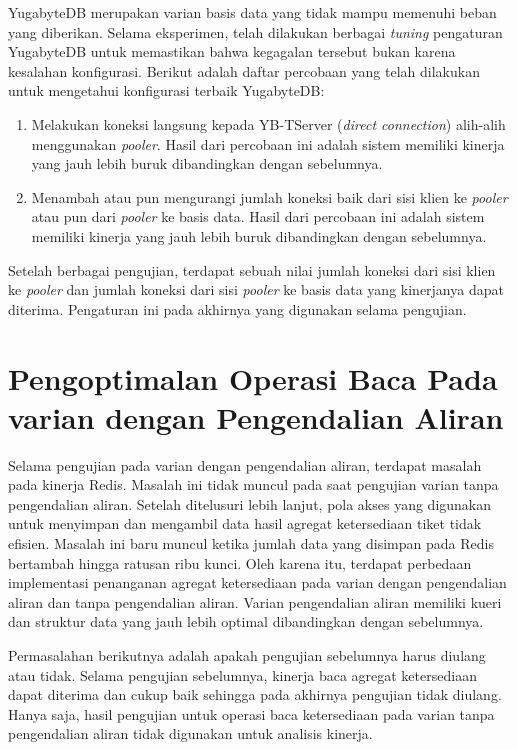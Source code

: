 YugabyteDB merupakan varian basis data yang tidak mampu memenuhi beban yang diberikan. Selama eksperimen, telah dilakukan berbagai \textit{tuning} pengaturan YugabyteDB untuk memastikan bahwa kegagalan tersebut bukan karena kesalahan konfigurasi. Berikut adalah daftar percobaan yang telah dilakukan untuk mengetahui konfigurasi terbaik YugabyteDB:

\begin{enumerate}
    \item Melakukan koneksi langsung kepada YB-TServer (\textit{direct connection}) alih-alih menggunakan \textit{pooler}. Hasil dari percobaan ini adalah sistem memiliki kinerja yang jauh lebih buruk dibandingkan dengan sebelumnya.
    \item Menambah atau pun mengurangi jumlah koneksi baik dari sisi klien ke \textit{pooler} atau pun dari \textit{pooler} ke basis data. Hasil dari percobaan ini adalah sistem memiliki kinerja yang jauh lebih buruk dibandingkan dengan sebelumnya.
\end{enumerate}

Setelah berbagai pengujian, terdapat sebuah nilai jumlah koneksi dari sisi klien ke \textit{pooler} dan jumlah koneksi dari sisi \textit{pooler} ke basis data yang kinerjanya dapat diterima. Pengaturan ini pada akhirnya yang digunakan selama pengujian.

\section{Pengoptimalan Operasi Baca Pada varian dengan Pengendalian Aliran}

Selama pengujian pada varian dengan pengendalian aliran, terdapat masalah pada kinerja Redis. Masalah ini tidak muncul pada saat pengujian varian tanpa pengendalian aliran. Setelah ditelusuri lebih lanjut, pola akses yang digunakan untuk menyimpan dan mengambil data hasil agregat ketersediaan tiket tidak efisien. Masalah ini baru muncul ketika jumlah data yang disimpan pada Redis bertambah hingga ratusan ribu kunci. Oleh karena itu, terdapat perbedaan implementasi penanganan agregat ketersediaan pada varian dengan pengendalian aliran dan tanpa pengendalian aliran. Varian pengendalian aliran memiliki kueri dan struktur data yang jauh lebih optimal dibandingkan dengan sebelumnya.

Permasalahan berikutnya adalah apakah pengujian sebelumnya harus diulang atau tidak. Selama pengujian sebelumnya, kinerja baca agregat ketersediaan dapat diterima dan cukup baik sehingga pada akhirnya pengujian tidak diulang. Hanya saja, hasil pengujian untuk operasi baca ketersediaan pada varian tanpa pengendalian aliran tidak digunakan untuk analisis kinerja.


